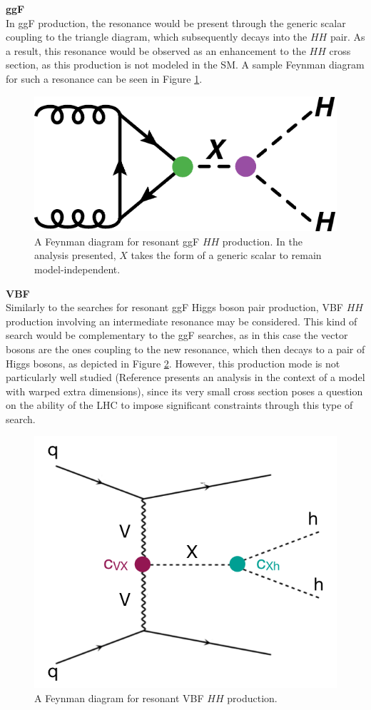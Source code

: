 \noindent\textbf{\gls{ggF}}\\
\indent In \gls{ggF} production, the resonance would be present through the generic scalar coupling to the triangle diagram, which subsequently decays into the $HH$ pair. As a result, this resonance would be observed as an enhancement to the $HH$ cross section, as this production is not modeled in the \gls{SM}. A sample Feynman diagram for such a resonance can be seen in Figure \ref{fig:ggf-resonant}.


\begin{figure}[!ht]
    \centering
    \includegraphics[width=.6\textwidth]{chapters/chapter1_theory/images/hh_res_ggf.pdf}
    \caption{A Feynman diagram for resonant ggF  $HH$ production. In the analysis presented, $X$ takes the form of a generic scalar to remain model-independent.}
    \label{fig:ggf-resonant}
\end{figure}

\noindent\textbf{VBF}\\
\indent Similarly to the searches for resonant ggF Higgs boson pair production, \gls{VBF} $HH$
production involving an intermediate resonance may be considered. This kind of search would be complementary to the ggF searches, as in this case the vector bosons are the ones coupling to the new resonance, which then decays to a pair of Higgs bosons, as depicted in Figure \ref{fig:vbf-resonant}. However, this production mode is not
particularly well studied (Reference \cite{res_vbf} presents an analysis in the context of a model with warped extra dimensions), since its very small cross section poses a question on the ability of the LHC to impose significant constraints through this type of search.

\begin{figure}[!ht]
    \centering
    \includegraphics[width=.55\textwidth]{chapters/chapter1_theory/images/vbf_resonant.png}
    \caption{A Feynman diagram for resonant VBF $HH$ production.}
    \label{fig:vbf-resonant}
\end{figure}

